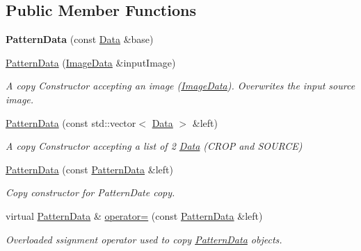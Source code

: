 \subsection*{Public Member Functions}
\begin{DoxyCompactItemize}
\item 
\mbox{\label{classfilter_1_1data_1_1_pattern_data_a75508e86cd68a051551ba821dba350d7}} 
{\bfseries Pattern\+Data} (const \hyperlink{classfilter_1_1data_1_1_data}{Data} \&base)
\item 
\hyperlink{classfilter_1_1data_1_1_pattern_data_a987309a850dd3c29ffc23186efe4c7ab}{Pattern\+Data} (\hyperlink{classfilter_1_1data_1_1_image_data}{Image\+Data} \&input\+Image)
\begin{DoxyCompactList}\small\item\em A copy Constructor accepting an image (\hyperlink{classfilter_1_1data_1_1_image_data}{Image\+Data}). Overwrites the input source image. \end{DoxyCompactList}\item 
\hyperlink{classfilter_1_1data_1_1_pattern_data_a947b630d84c0507db65eab7851c106a7}{Pattern\+Data} (const std\+::vector$<$ \hyperlink{classfilter_1_1data_1_1_data}{Data} $>$ \&left)
\begin{DoxyCompactList}\small\item\em A copy Constructor accepting a list of 2 \hyperlink{classfilter_1_1data_1_1_data}{Data} (C\+R\+OP and S\+O\+U\+R\+CE) \end{DoxyCompactList}\item 
\hyperlink{classfilter_1_1data_1_1_pattern_data_a613199ad48d420607e97501258db7be1}{Pattern\+Data} (const \hyperlink{classfilter_1_1data_1_1_pattern_data}{Pattern\+Data} \&left)
\begin{DoxyCompactList}\small\item\em Copy constructor for Pattern\+Date copy. \end{DoxyCompactList}\item 
virtual \hyperlink{classfilter_1_1data_1_1_pattern_data}{Pattern\+Data} \& \hyperlink{classfilter_1_1data_1_1_pattern_data_ab7207131a33c3708fa04fa832ae0f458}{operator=} (const \hyperlink{classfilter_1_1data_1_1_pattern_data}{Pattern\+Data} \&left)
\begin{DoxyCompactList}\small\item\em Overloaded ssignment operator used to copy \hyperlink{classfilter_1_1data_1_1_pattern_data}{Pattern\+Data} objects. \end{DoxyCompactList}\item 

\end{DoxyCompactItemize}

